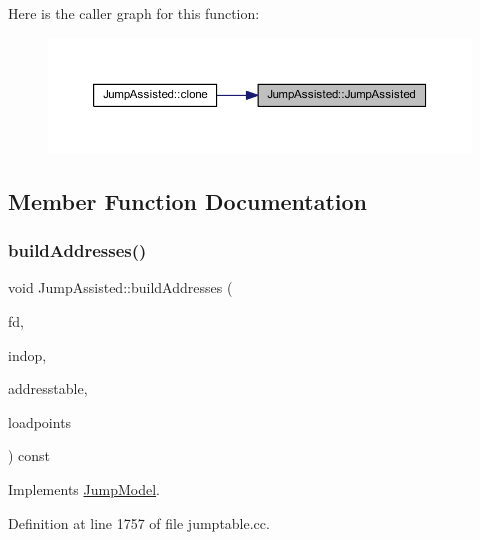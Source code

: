 Here is the caller graph for this function\+:
\nopagebreak
\begin{figure}[H]
\begin{center}
\leavevmode
\includegraphics[width=350pt]{class_jump_assisted_aa8168c811826d1a3a55c505a7eefbc7d_icgraph}
\end{center}
\end{figure}


\subsection{Member Function Documentation}
\mbox{\label{class_jump_assisted_aff52f4a983f867d9bd105a6856e473a5}} 
\subsubsection{\texorpdfstring{buildAddresses()}{buildAddresses()}}
{\footnotesize\ttfamily void Jump\+Assisted\+::build\+Addresses (\begin{DoxyParamCaption}\item[{\mbox{\hyperlink{class_funcdata}{Funcdata}} $\ast$}]{fd,  }\item[{\mbox{\hyperlink{class_pcode_op}{Pcode\+Op}} $\ast$}]{indop,  }\item[{vector$<$ \mbox{\hyperlink{class_address}{Address}} $>$ \&}]{addresstable,  }\item[{vector$<$ \mbox{\hyperlink{class_load_table}{Load\+Table}} $>$ $\ast$}]{loadpoints }\end{DoxyParamCaption}) const\hspace{0.3cm}{\ttfamily [virtual]}}



Implements \mbox{\hyperlink{class_jump_model_a12659a93442cc2940a8fed8dc55be2e0}{Jump\+Model}}.



Definition at line 1757 of file jumptable.\+cc.

